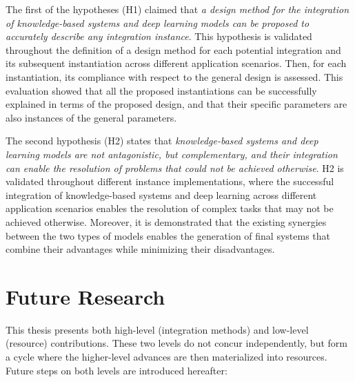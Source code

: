 The first of the hypotheses (H1) claimed that \textit{a design method for the integration of knowledge-based systems and deep learning models can be proposed to accurately describe any integration instance}. This hypothesis is validated throughout the definition of a design method for each potential integration and its subsequent instantiation across different application scenarios. Then, for each instantiation, its compliance with respect to the general design is assessed. This evaluation showed that all the proposed instantiations can be successfully explained in terms of the proposed design, and that their specific parameters are also instances of the general parameters. 

The second hypothesis (H2) states that \textit{knowledge-based systems and deep learning models are not antagonistic, but complementary, and their integration can enable the resolution of problems that could not be achieved otherwise}. H2 is validated throughout different instance implementations, where the successful integration of knowledge-based systems and deep learning across different application scenarios enables the resolution of complex tasks that may not be achieved otherwise. Moreover, it is demonstrated that the existing synergies between the two types of models enables the generation of final systems that combine their advantages while minimizing their disadvantages.


\section{Future Research}\label{7_sec:future_research}
This thesis presents both high-level (integration methods) and low-level (resource) contributions. These two levels do not concur independently, but form a cycle where the higher-level advances are then materialized into resources. Future steps on both levels are introduced hereafter:

